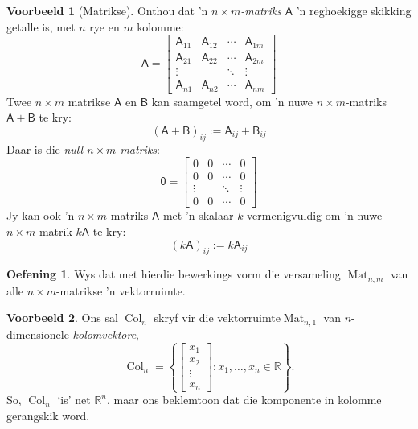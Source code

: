 \documentclass[a4paper,11pt]{book}
\theoremstyle{definition}
\newtheorem{exercise}{Oefening}
\newtheorem{example_environment}{Voorbeeld}[chapter]
\newcommand{\mat}[1]{\mathsf{#1}}
\newenvironment{example}
	{
		\begin{oframed}
		\begin{example_environment}
	}
	{
		\end{example_environment}
		\end{oframed}
	}
\DeclareMathOperator{\Mat}{Mat}
\DeclareMathOperator{\Col}{Col}
\begin{document}
\begin{example}[Matrikse] \label{matrices_example_vec_space} Onthou dat 'n
	\emph{$n \times m$-matriks}
	$\mat{A}$ 'n reghoekigge skikking getalle is, met $n$ rye en $m$
	kolomme:
	\[
		\mat{A} = \left[ \begin{array}{cccc} \mat{A}_{11} & \mat{A}_{12} &
			\cdots & \mat{A}_{1m} \\
			\mat{A}_{21} & \mat{A}_{22} & \cdots & \mat{A}_{2m} \\
			\vdots & & \ddots & \vdots \\
		\mat{A}_{n1} & \mat{A}_{n2} & \cdots & \mat{A}_{nm} \end{array}
		\right]
	\]
	Twee $n \times m$ matrikse $\mat{A}$ en $\mat{B}$ kan saamgetel word,
	om 'n nuwe $n \times m$-matriks $\mat{A} + \mat{B}$ te kry:
	\[
		(\mat{A} + \mat{B})_{ij} := \mat{A}_{ij} + \mat{B}_{ij}
	\]
	Daar is die \emph{null-$n \times m$-matriks}:
	\[
		\mat{0} = \left[ \begin{array}{cccc} 
			0 & 0 &  \cdots &0 \\
			0 & 0 &  \cdots & 0 \\
			\vdots & & \ddots & \vdots \\
			0 & 0 & \cdots & 0
		\end{array} \right] 
	\]
	Jy kan ook 'n $n \times m$-matriks $\mat{A}$ met 'n skalaar $k$
	vermenigvuldig om 'n nuwe $n \times m$-matrik $k \mat{A}$ te kry:
	\[
		(k\mat{A})_{ij} := k \mat{A}_{ij}
	\]
	\begin{exercise} Wys dat met hierdie bewerkings vorm die versameling
		$\Mat_{n, m}$ van alle $n \times m$-matrikse 'n
		vektorruimte. 
	\end{exercise}
\end{example}

\begin{example} Ons sal $\Col_n$ skryf vir die vektorruimte$\Mat_{n,1}$ van
	$n$-dimensionele \emph{kolomvektore},
	\[
		\Col_n = \left\{ \left[ \begin{array}{c} x_1 \\ x_2 \\ \vdots \\
		x_n \end{array} \right] : x_1, \ldots, x_n \in \mathbb{R} \right\}.
	\]
	So, $\Col_n$ `is' net $\mathbb{R}^n$, maar ons beklemtoon dat die
	komponente in kolomme gerangskik word.
\end{example}
\end{document}
